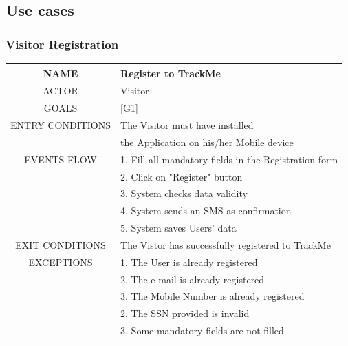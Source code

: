 \documentclass[12pt,a4paper]{article}
\begin{document}
	\newpage
	\subsection{Use cases}
	\subsubsection{Visitor Registration }
	\begin{center}
		\begin{tabular}{| c | l |}
			\hline
			NAME & Register to TrackMe \\
			\hline
			ACTOR & Visitor \\
			\hline
			GOALS & [G1] \\
			\hline
			ENTRY CONDITIONS & The Visitor must have installed \\
			&	the Application on his/her Mobile device \\ \hline
			EVENTS FLOW  &
			1. Fill all mandatory fields in the Registration form\\
			&2. Click on "Register" button\\
			&3. System checks data validity\\
			&4. System sends an SMS as confirmation\\
			&5. System saves Users' data\\
			\hline
			EXIT CONDITIONS  & The Vistor has successfully registered to TrackMe\\ \hline
			EXCEPTIONS & 
			1. The User is already registered\\
			&2. The e-mail is already registered\\
			&3. The Mobile Number is already registered\\
			&2. The SSN provided is invalid\\
			&3. Some mandatory fields are not filled\\
			\hline
		\end{tabular}
	\end{center}
\end{document}
